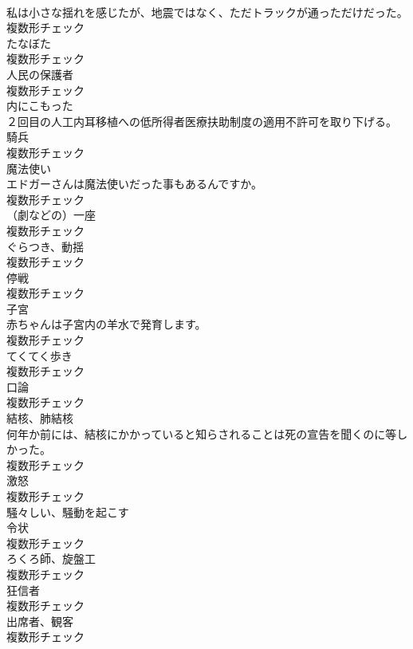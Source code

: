 \documentclass[8pt]{extreport}
\begin{document}
\begin{CJK}{UTF8}{min}
\\	私は小さな揺れを感じたが、地震ではなく、ただトラックが通っただけだった。	
\\	複数形チェック
\\	[名詞]	たなぼた	
\\	複数形チェック
\\	[名詞]	人⺠の保護者	
\\	複数形チェック
\\	[形容詞]	内にこもった	
\\	２回目の人工内耳移植への低所得者医療扶助制度の適用不許可を取り下げる。	
\\	[名詞]	騎兵	
\\	複数形チェック
\\	[名詞]	魔法使い	
\\	エドガーさんは魔法使いだった事もあるんですか。	
\\	複数形チェック
\\	[名詞]	（劇などの）一座	
\\	複数形チェック
\\	[名詞]	ぐらつき、動揺	
\\	複数形チェック
\\	[名詞]	停戦	
\\	複数形チェック
\\	[名詞]	子宮	
\\	赤ちゃんは子宮内の羊水で発育します。	
\\	複数形チェック
\\	[名詞]	てくてく歩き	
\\	複数形チェック
\\	[名詞]	口論	
\\	複数形チェック
\\	[名詞]	結核、肺結核	
\\	何年か前には、結核にかかっていると知らされることは死の宣告を聞くのに等しかった。	
\\	複数形チェック
\\	[名詞]	激怒	
\\	複数形チェック
\\	[形容詞]	騒々しい、騒動を起こす	
\\	[名詞]	令状	
\\	複数形チェック
\\	[名詞]	ろくろ師、旋盤工	
\\	複数形チェック
\\	[名詞]	狂信者	
\\	複数形チェック
\\	[名詞]	出席者、観客	
\\	複数形チェック

\end{CJK}
\end{document}
